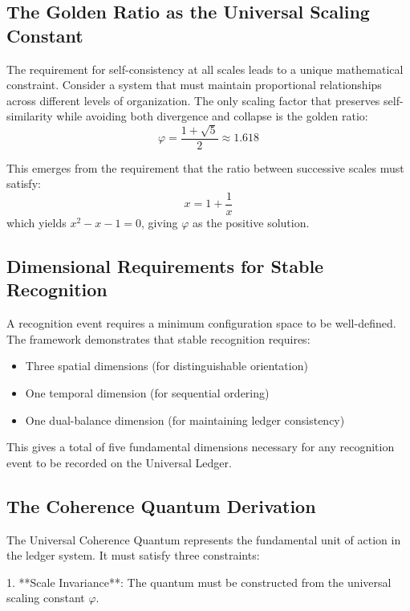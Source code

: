 \documentclass[11pt,a4paper]{article}
\theoremstyle{definition}
\theoremstyle{remark}
\begin{document}
\subsection{The Golden Ratio as the Universal Scaling Constant}

The requirement for self-consistency at all scales leads to a unique mathematical constraint. Consider a system that must maintain proportional relationships across different levels of organization. The only scaling factor that preserves self-similarity while avoiding both divergence and collapse is the golden ratio:
\begin{equation}
    \varphi = \frac{1 + \sqrt{5}}{2} \approx 1.618
\end{equation}

This emerges from the requirement that the ratio between successive scales must satisfy:
\begin{equation}
    x = 1 + \frac{1}{x}
\end{equation}
which yields \(x^2 - x - 1 = 0\), giving \(\varphi\) as the positive solution.

\subsection{Dimensional Requirements for Stable Recognition}

A recognition event requires a minimum configuration space to be well-defined. The framework demonstrates that stable recognition requires:
\begin{itemize}
    \item Three spatial dimensions (for distinguishable orientation)
    \item One temporal dimension (for sequential ordering)
    \item One dual-balance dimension (for maintaining ledger consistency)
\end{itemize}

This gives a total of five fundamental dimensions necessary for any recognition event to be recorded on the Universal Ledger.

\subsection{The Coherence Quantum Derivation}

The Universal Coherence Quantum represents the fundamental unit of action in the ledger system. It must satisfy three constraints:

1. **Scale Invariance**: The quantum must be constructed from the universal scaling constant \(\varphi\).
\end{document}
